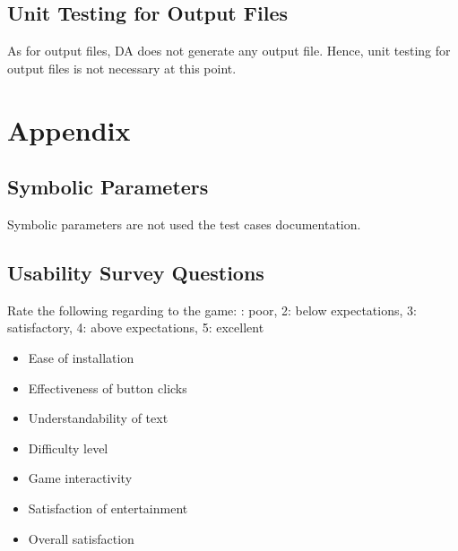 \documentclass[12,english]{article}
\begin{document}
\subsection{Unit Testing for Output Files}
As for output files, DA does not generate any output file. Hence, unit testing for output files is not necessary at this point.

\section{Appendix}
\subsection{Symbolic Parameters}
Symbolic parameters are not used the test cases documentation.

\subsection{Usability Survey Questions}
Rate the following regarding to the game:
: poor, 2: below expectations, 3: satisfactory, 4: above expectations, 5: excellent
\begin{itemize}
    \item Ease of installation
    \item Effectiveness of button clicks
    \item Understandability of text
    \item Difficulty level
    \item Game interactivity
    \item Satisfaction of entertainment
    \item Overall satisfaction
\end{itemize}



 
\end{document}
